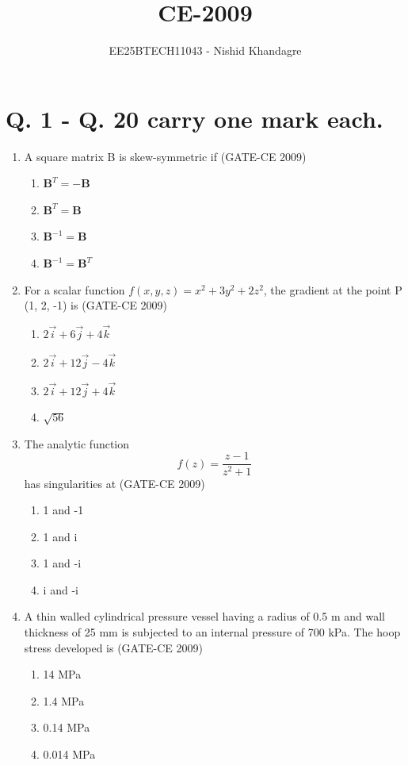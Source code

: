 \documentclass[12pt]{article}
\title{CE-2009}
\author{EE25BTECH11043 - Nishid Khandagre}
\date{}
\begin{document}
\maketitle

\section*{Q. 1 - Q. 20 carry one mark each.}
\begin{enumerate}[label=Q.\arabic*]
    \item A square matrix B is skew-symmetric if (GATE-CE 2009)
    \begin{enumerate}[label=(\Alph*)]
        \item $\mathbf{B}^T = -\mathbf{B}$ 
        \item $\mathbf{B}^T = \mathbf{B}$ 
        \item $\mathbf{B}^{-1} = \mathbf{B}$ 
        \item $\mathbf{B}^{-1} = \mathbf{B}^T$
    \end{enumerate}
    
    \item For a scalar function $f(x, y, z) = x^2 + 3y^2 + 2z^2$, the gradient at the point P (1, 2, -1) is (GATE-CE 2009)
    \begin{enumerate}[label=(\Alph*)]
        \item $2\vec{i} + 6\vec{j} + 4\vec{k}$
        \item $2\vec{i} + 12\vec{j} - 4\vec{k}$
        \item $2\vec{i} + 12\vec{j} + 4\vec{k}$
        \item $\sqrt{56}$
    \end{enumerate}
    
    \item The analytic function $$f(z) = \frac{z-1}{z^2+1}$$ has singularities at (GATE-CE 2009)
    \begin{enumerate}[label=(\Alph*)]
        \item 1 and -1 
        \item 1 and i 
        \item 1 and -i 
        \item i and -i
    \end{enumerate}
    
    \item A thin walled cylindrical pressure vessel having a radius of 0.5 m and wall thickness of 25 mm is subjected to an internal pressure of 700 kPa. The hoop stress developed is (GATE-CE 2009)
    \begin{enumerate}[label=(\Alph*)]
        \item 14 MPa 
        \item 1.4 MPa 
        \item 0.14 MPa 
        \item 0.014 MPa
    \end{enumerate}
    

\end{enumerate}
\end{document}
